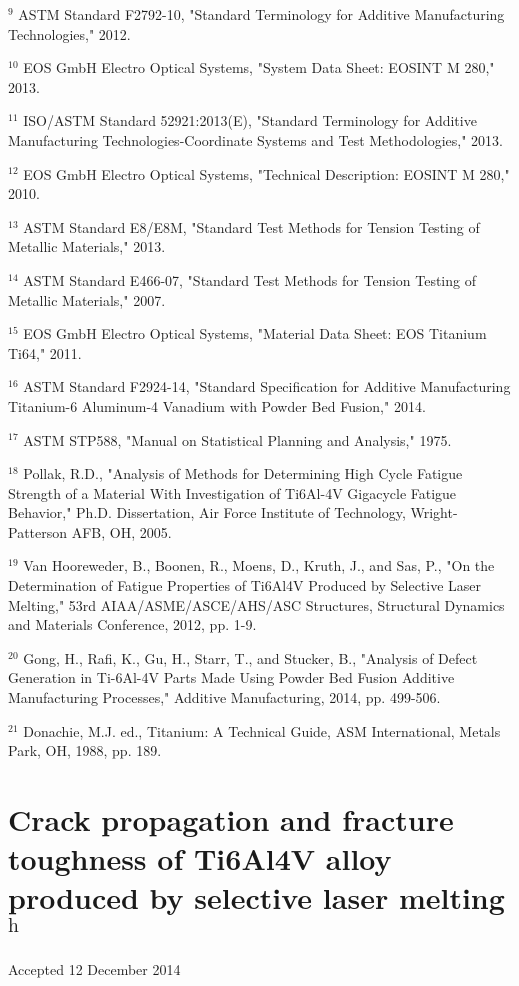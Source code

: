 \documentclass[10pt]{article}
\begin{document}
${ }^{9}$ ASTM Standard F2792-10, "Standard Terminology for Additive Manufacturing Technologies," 2012.

${ }^{10}$ EOS GmbH Electro Optical Systems, "System Data Sheet: EOSINT M 280," 2013.

${ }^{11}$ ISO/ASTM Standard 52921:2013(E), "Standard Terminology for Additive Manufacturing Technologies-Coordinate Systems and Test Methodologies," 2013.

${ }^{12}$ EOS GmbH Electro Optical Systems, "Technical Description: EOSINT M 280," 2010.

${ }^{13}$ ASTM Standard E8/E8M, "Standard Test Methods for Tension Testing of Metallic Materials," 2013.

${ }^{14}$ ASTM Standard E466-07, "Standard Test Methods for Tension Testing of Metallic Materials," 2007.

${ }^{15}$ EOS GmbH Electro Optical Systems, "Material Data Sheet: EOS Titanium Ti64," 2011.

${ }^{16}$ ASTM Standard F2924-14, "Standard Specification for Additive Manufacturing Titanium-6 Aluminum-4 Vanadium with Powder Bed Fusion," 2014.

${ }^{17}$ ASTM STP588, "Manual on Statistical Planning and Analysis," 1975.

${ }^{18}$ Pollak, R.D., "Analysis of Methods for Determining High Cycle Fatigue Strength of a Material With Investigation of Ti6Al-4V Gigacycle Fatigue Behavior," Ph.D. Dissertation, Air Force Institute of Technology, Wright-Patterson AFB, OH, 2005.

${ }^{19}$ Van Hooreweder, B., Boonen, R., Moens, D., Kruth, J., and Sas, P., "On the Determination of Fatigue Properties of Ti6Al4V Produced by Selective Laser Melting," 53rd AIAA/ASME/ASCE/AHS/ASC Structures, Structural Dynamics and Materials Conference, 2012, pp. 1-9.

${ }^{20}$ Gong, H., Rafi, K., Gu, H., Starr, T., and Stucker, B., "Analysis of Defect Generation in Ti-6Al-4V Parts Made Using Powder Bed Fusion Additive Manufacturing Processes," Additive Manufacturing, 2014, pp. 499-506.

${ }^{21}$ Donachie, M.J. ed., Titanium: A Technical Guide, ASM International, Metals Park, OH, 1988, pp. 189.

\section*{Crack propagation and fracture toughness of Ti6Al4V alloy produced by selective laser melting ${ }^{\text {h }}$ }
Accepted 12 December 2014
\end{document}
